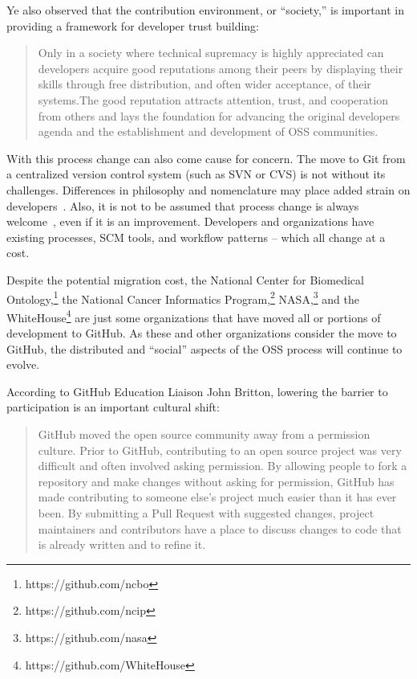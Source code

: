 \documentclass{proc}
\begin{document}
{{{{{Ye also observed that the contribution environment, or ``society,'' is important in providing a framework for developer trust building:
\begin{quote}
Only in a society where technical supremacy is highly appreciated can developers acquire good reputations among their peers by displaying their skills through free distribution, and often wider acceptance, of their systems.The good reputation attracts attention, trust, and cooperation from others and lays the foundation for advancing the original developers agenda and the establishment and development of OSS communities.~\cite{ye2003toward}
\end{quote}

With this process change can also come cause for concern. The move to Git from a centralized version control system (such as SVN or CVS) is not without its challenges. Differences in philosophy and nomenclature may place added strain on developers~\cite{bird2009promises}. Also, it is not to be assumed that process change is always welcome~\cite{de2009software}, even if it is an improvement. Developers and organizations have existing processes, SCM tools, and workflow patterns -- which all change at a cost.

Despite the potential migration cost, the National Center for Biomedical Ontology,\footnote{https://github.com/ncbo} the National Cancer Informatics Program,\footnote{https://github.com/ncip} NASA,\footnote{https://github.com/nasa} and the WhiteHouse\footnote{https://github.com/WhiteHouse} are just some organizations that have moved all or portions of development to GitHub. As these and other organizations consider the move to GitHub, the distributed and ``social'' aspects of the OSS process will continue to evolve.

According to GitHub Education Liaison John Britton, lowering the barrier to participation is an important cultural shift:
\begin{quote}
GitHub moved the open source community away from a permission culture. Prior to GitHub, contributing to an open source project was very difficult and often involved asking permission. By allowing people to fork a repository and make changes without asking for permission, GitHub has made contributing to someone else's project much easier than it has ever been. By submitting a Pull Request with suggested changes, project maintainers and contributors have a place to discuss changes to code that is already written and to refine it.~\cite{github_interview}
\end{quote}

}}}}}
\end{document}
